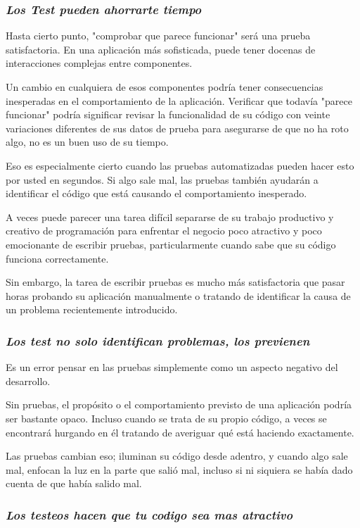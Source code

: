 \documentclass[10pt]{article}
\begin{document}
\subsubsection*{\textit{Los Test pueden ahorrarte tiempo}}
Hasta cierto punto, "comprobar que parece funcionar" será una prueba satisfactoria. En una aplicación más sofisticada, puede tener docenas de interacciones complejas entre componentes.


Un cambio en cualquiera de esos componentes podría tener consecuencias inesperadas en el comportamiento de la aplicación. Verificar que todavía "parece funcionar" podría significar revisar la funcionalidad de su código con veinte variaciones diferentes de sus datos de prueba para asegurarse de que no ha roto algo, no es un buen uso de su tiempo.

Eso es especialmente cierto cuando las pruebas automatizadas pueden hacer esto por usted en segundos. Si algo sale mal, las pruebas también ayudarán a identificar el código que está causando el comportamiento inesperado.

A veces puede parecer una tarea difícil separarse de su trabajo productivo y creativo de programación para enfrentar el negocio poco atractivo y poco emocionante de escribir pruebas, particularmente cuando sabe que su código funciona correctamente.

Sin embargo, la tarea de escribir pruebas es mucho más satisfactoria que pasar horas probando su aplicación manualmente o tratando de identificar la causa de un problema recientemente introducido.

\subsubsection*{\textit{Los test no solo identifican problemas, los previenen}}
Es un error pensar en las pruebas simplemente como un aspecto negativo del desarrollo.

Sin pruebas, el propósito o el comportamiento previsto de una aplicación podría ser bastante opaco. Incluso cuando se trata de su propio código, a veces se encontrará hurgando en él tratando de averiguar qué está haciendo exactamente.

Las pruebas cambian eso; iluminan su código desde adentro, y cuando algo sale mal, enfocan la luz en la parte que salió mal, incluso si ni siquiera se había dado cuenta de que había salido mal.

\subsubsection*{\textit{Los testeos hacen que tu codigo sea mas atractivo}}
\end{document}
